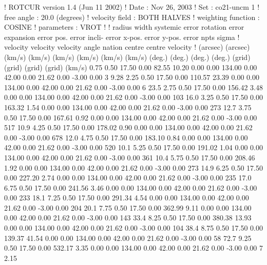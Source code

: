 ! ROTCUR  version 1.4 (Jun 11 2002)
! Date               : Nov 26, 2003
! Set                : co21-uncm 1
! free angle         :  20.0 (degrees)
! velocity field     : BOTH HALVES
! weighting function : COSINE
! parameters         : VROT
! 
!   radius    width systemic  error rotation  error expansion  error    pos.  error incli-  error x-pos.  error y-pos.  error npts   sigma
!                   velocity        velocity         velocity          angle        nation        centre        centre             velocity
! (arcsec) (arcsec)   (km/s) (km/s)   (km/s) (km/s)    (km/s) (km/s)  (deg.) (deg.) (deg.) (deg.) (grid) (grid) (grid) (grid)        (km/s)
      0.75     0.50    17.50   0.00    82.55  10.20      0.00   0.00  134.00   0.00  42.00   0.00  21.62   0.00  -3.00   0.00    3     9.28
      2.25     0.50    17.50   0.00   110.57  23.39      0.00   0.00  134.00   0.00  42.00   0.00  21.62   0.00  -3.00   0.00    6     23.5
      2.75     0.50    17.50   0.00   156.42   3.48      0.00   0.00  134.00   0.00  42.00   0.00  21.62   0.00  -3.00   0.00  103     16.0
      3.25     0.50    17.50   0.00   163.32   1.54      0.00   0.00  134.00   0.00  42.00   0.00  21.62   0.00  -3.00   0.00  273     12.7
      3.75     0.50    17.50   0.00   167.61   0.92      0.00   0.00  134.00   0.00  42.00   0.00  21.62   0.00  -3.00   0.00  517     10.9
      4.25     0.50    17.50   0.00   178.02   0.90      0.00   0.00  134.00   0.00  42.00   0.00  21.62   0.00  -3.00   0.00  678     12.0
      4.75     0.50    17.50   0.00   183.10   0.84      0.00   0.00  134.00   0.00  42.00   0.00  21.62   0.00  -3.00   0.00  520     10.1
      5.25     0.50    17.50   0.00   191.02   1.04      0.00   0.00  134.00   0.00  42.00   0.00  21.62   0.00  -3.00   0.00  361     10.4
      5.75     0.50    17.50   0.00   208.46   1.92      0.00   0.00  134.00   0.00  42.00   0.00  21.62   0.00  -3.00   0.00  273     14.9
      6.25     0.50    17.50   0.00   227.20   2.74      0.00   0.00  134.00   0.00  42.00   0.00  21.62   0.00  -3.00   0.00  235     17.0
      6.75     0.50    17.50   0.00   241.56   3.46      0.00   0.00  134.00   0.00  42.00   0.00  21.62   0.00  -3.00   0.00  233     18.1
      7.25     0.50    17.50   0.00   291.34   4.54      0.00   0.00  134.00   0.00  42.00   0.00  21.62   0.00  -3.00   0.00  204     20.1
      7.75     0.50    17.50   0.00   362.99   9.11      0.00   0.00  134.00   0.00  42.00   0.00  21.62   0.00  -3.00   0.00  143     33.4
      8.25     0.50    17.50   0.00   380.38  13.93      0.00   0.00  134.00   0.00  42.00   0.00  21.62   0.00  -3.00   0.00  104     38.4
      8.75     0.50    17.50   0.00   139.37  41.54      0.00   0.00  134.00   0.00  42.00   0.00  21.62   0.00  -3.00   0.00   58     72.7
      9.25     0.50    17.50   0.00   532.17   3.35      0.00   0.00  134.00   0.00  42.00   0.00  21.62   0.00  -3.00   0.00    7     2.15